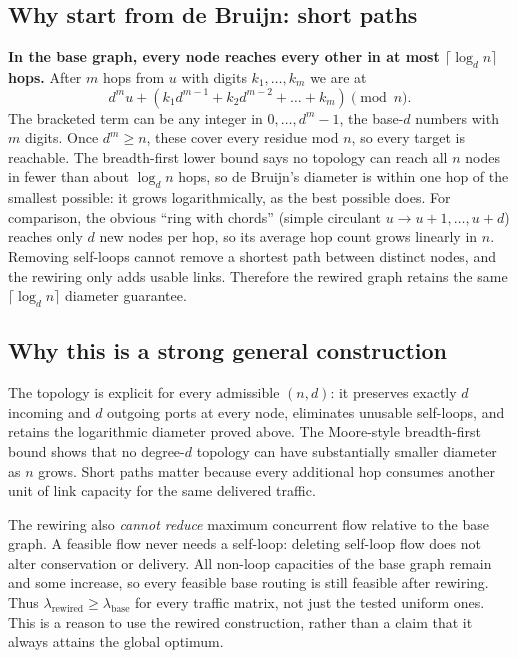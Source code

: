 \documentclass[11pt,letterpaper]{article}
\begin{document}
\subsection{Why start from de Bruijn: short paths}
\textbf{In the base graph, every node reaches every other in at most
$\lceil\log_d n\rceil$ hops.}
After $m$ hops from $u$ with digits $k_1,\dots,k_m$ we are at
\[
d^m u + (k_1 d^{m-1} + k_2 d^{m-2} + \dots + k_m) \pmod n .
\]
The bracketed term can be any integer in $0,\dots,d^m-1$, the base-$d$ numbers
with $m$ digits. Once $d^m\ge n$, these cover every residue mod $n$, so every
target is reachable. The breadth-first lower bound says no topology can reach
all $n$ nodes in fewer than about $\log_d n$ hops, so de Bruijn's diameter is
within one hop of the smallest possible: it grows logarithmically, as the best
possible does. For
comparison, the obvious ``ring with chords'' (simple circulant
$u\to u+1,\dots,u+d$) reaches only $d$ new nodes per hop, so its average hop
count grows linearly in $n$.
Removing self-loops cannot remove a shortest path between distinct nodes, and
the rewiring only adds usable links. Therefore the rewired graph retains the
same $\lceil\log_d n\rceil$ diameter guarantee.

\subsection{Why this is a strong general construction}
The topology is explicit for every admissible $(n,d)$: it preserves exactly $d$
incoming and $d$ outgoing ports at every node, eliminates unusable self-loops,
and retains the logarithmic diameter proved above. The Moore-style breadth-first
bound shows that no degree-$d$ topology can have substantially smaller diameter
as $n$ grows. Short paths matter because every additional hop consumes another
unit of link capacity for the same delivered traffic.

The rewiring also \emph{cannot reduce} maximum concurrent flow relative to the
base graph. A feasible flow never needs a self-loop: deleting self-loop flow
does not alter conservation or delivery. All non-loop capacities of the base
graph remain and some increase, so every feasible base routing is still
feasible after rewiring. Thus $\lambda_{\mathrm{rewired}}\ge
\lambda_{\mathrm{base}}$ for every traffic matrix, not just the tested uniform
ones. This is a reason to use the rewired construction, rather than a claim
that it always attains the global optimum.
\end{document}
